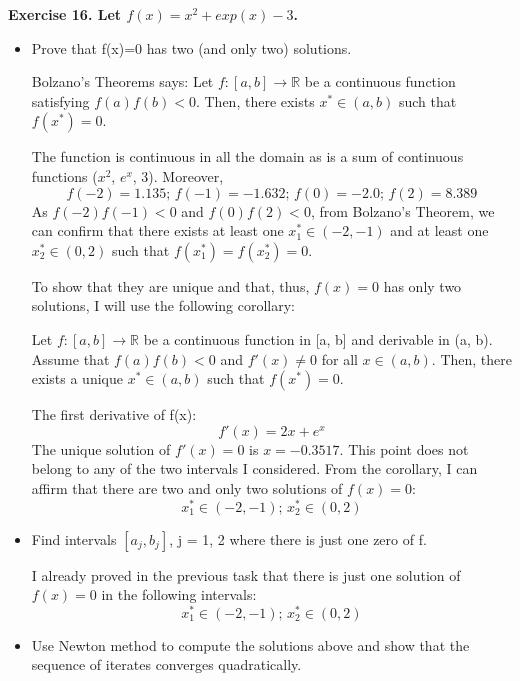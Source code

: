 \documentclass[12pt,letterpaper]{article}
\theoremstyle{definition}
\begin{document}
\textbf{Exercise 16. Let $f(x)=x^2+exp(x)-3$.}
\begin{itemize}
    \item Prove that f(x)=0 has two (and only two) solutions.
    
    Bolzano's Theorems says: Let $f : [a, b] \longrightarrow \mathbb{R}$ be a continuous function satisfying $f(a)f(b)< 0$. Then, there exists $x^* \in (a, b)$ such that $f(x^*) = 0$.
    
    The function is continuous in all the domain as is a sum of continuous functions ($x^2$, $e^x$, 3). Moreover,
    $$f(-2)=1.135\text{;    }f(-1)=-1.632\text{;      }f(0)=-2.0\text{;      }f(2)=8.389$$
    As $f(-2)f(-1)< 0$ and $f(0)f(2)< 0$, from Bolzano's Theorem, we can confirm that there exists at least one $x_1^* \in (-2, -1)$ and at least one $x_2^* \in (0, 2)$ such that $f(x_1^*)=f(x_2^*) = 0$.
    
    To show that they are unique and that, thus, $f(x)=0$ has only two solutions, I will use the following corollary: 
    
    Let $f : [a, b] \longrightarrow \mathbb{R}$ be a continuous function in [a, b] and derivable in (a, b). Assume that $f(a)f(b)< 0$ and $f'(x)\neq 0$ for all $x \in (a, b)$. Then, there exists a unique $x^* \in (a, b)$ such that $f(x^*) = 0$.
    
    The first derivative of f(x):
    $$f'(x)=2x+e^x$$ 
    The unique solution of $f'(x)=0$ is $x=-0.3517$. This point does not belong to any of the two intervals I considered. From the corollary, I can affirm that there are two and only two solutions of $f(x)=0$:
    $$x_1^* \in (-2, -1)\text{;   }x_2^* \in (0, 2)$$
    
    \item Find intervals $[a_j, b_j]$, j = 1, 2 where there is just one zero of f.
    
    I already proved in the previous task that there is just one solution of $f(x)=0$ in the following intervals:
    $$x_1^* \in (-2, -1)\text{;   }x_2^* \in (0, 2)$$
    
    \item Use Newton method to compute the solutions above and show that the sequence of iterates converges quadratically.
\end{itemize}
\end{document}
